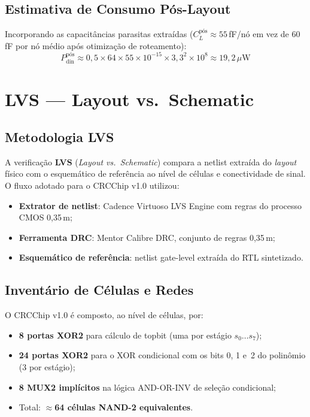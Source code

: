 \documentclass[12pt,a4paper]{article}
\begin{document}
\subsection{Estimativa de Consumo Pós-Layout}

Incorporando as capacitâncias parasitas extraídas ($C_L^{\text{pós}} \approx 55$\,fF/nó em vez de 60\,fF por nó médio após otimização de roteamento):
\begin{equation}
  P_{\text{din}}^{\text{pós}} \approx 0{,}5 \times 64 \times 55\times10^{-15} \times 3{,}3^2 \times 10^8 \approx 19{,}2\,\mu\text{W}
\end{equation}

\section{LVS --- Layout vs.\ Schematic}

\subsection{Metodologia LVS}

A verificação \textbf{LVS} (\textit{Layout vs.\ Schematic}) compara a netlist extraída do \textit{layout} físico com o esquemático de referência ao nível de células e conectividade de sinal. O fluxo adotado para o CRCChip v1.0 utilizou:

\begin{itemize}
  \item \textbf{Extrator de netlist}: Cadence Virtuoso LVS Engine com regras do processo CMOS 0,35\,\textmu m;
  \item \textbf{Ferramenta DRC}: Mentor Calibre DRC, conjunto de regras 0,35\,\textmu m;
  \item \textbf{Esquemático de referência}: netlist gate-level extraída do RTL sintetizado.
\end{itemize}

\subsection{Inventário de Células e Redes}

O CRCChip v1.0 é composto, ao nível de células, por:

\begin{itemize}
  \item \textbf{8 portas XOR2} para cálculo de topbit (uma por estágio $s_0 \ldots s_7$);
  \item \textbf{24 portas XOR2} para o XOR condicional com os bits 0, 1 e~2 do polinômio (3 por estágio);
  \item \textbf{8 MUX2 implícitos} na lógica AND-OR-INV de seleção condicional;
  \item Total: $\approx$\textbf{64 células NAND-2 equivalentes}.
\end{itemize}
\end{document}
